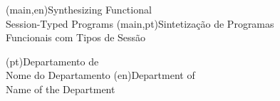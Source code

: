 
%


\nttitle(main,en){Synthesizing Functional\\Session-Typed Programs}%
\nttitle(main,pt){Sintetização de Programas\\Funcionais com Tipos de Sessão}%



\ntdepartment*(pt){Departamento de\\Nome do Departamento}
\ntdepartment*(en){Department of\\Name of the Department}

